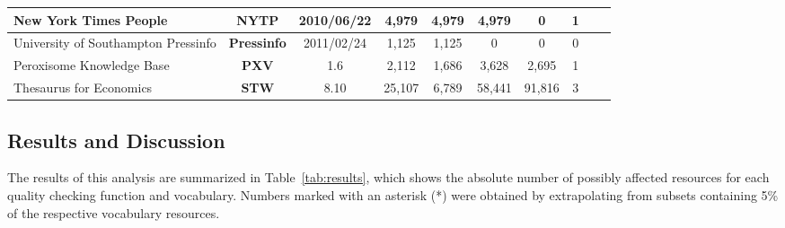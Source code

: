 \begin{table}
\begin{center}
{\begin{tabular}{p{6cm}ccccccccc}
\hline
New York Times People & \textbf{NYTP} & 2010/06/22 & 4,979 & 4,979 & 4,979 & 0 & 1 \\
\hline
University of Southampton Pressinfo & \textbf{Pressinfo} & 2011/02/24 & 1,125 & 1,125 & 0 & 0 & 0 \\
\hline
Peroxisome Knowledge Base & \textbf{PXV} & 1.6 & 2,112 & 1,686 & 3,628 & 2,695 & 1 \\
\hline
Thesaurus for Economics & \textbf{STW} & 8.10 & 25,107 & 6,789 & 58,441 & 91,816 & 3 \\
\bottomrule
\end{tabular}
}
\end{center}
\end{table}

\subsection{Results and Discussion}

The results of this analysis are summarized in Table~\ref{tab:results}, which shows the absolute number of possibly affected resources for each quality checking function and vocabulary. Numbers marked with an asterisk (*) were obtained by extrapolating from subsets containing 5\% of the respective vocabulary resources.

